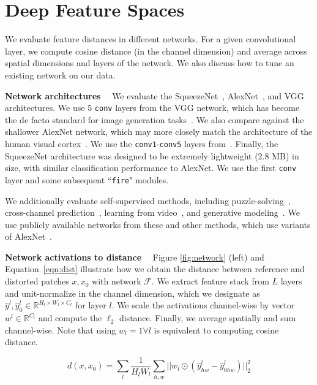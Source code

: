 \section{Deep Feature Spaces}

We evaluate feature distances in different networks. For a given convolutional layer, we compute cosine distance (in the channel dimension) and average across spatial dimensions and layers of the network. We also discuss how to tune an existing network on our data.

  \textbf{Network architectures} \ \  We evaluate the SqueezeNet~\cite{iandola2016squeezenet}, AlexNet~\cite{krizhevsky2012imagenet}, and VGG~\cite{simonyan2014very} architectures. We use 5 \texttt{conv} layers from the VGG network, which has become the de facto standard for image generation tasks~\cite{gatys2016image,dosovitskiy2016generating,chen2017photographic}. We also compare against the shallower AlexNet network, which may more closely match the architecture of the human visual cortex~\cite{yamins2016using}. We use the \texttt{conv1}-\texttt{conv5} layers from~\cite{krizhevsky2014one}. Finally, the SqueezeNet architecture was designed to be extremely lightweight ($2.8$ MB) in size, with similar classification performance to AlexNet. We use the first \texttt{conv} layer and some subsequent ``\texttt{fire}" modules.

We additionally evaluate self-supervised methods, including puzzle-solving~\cite{noroozi2016unsupervised}, cross-channel prediction~\cite{zhang2016colorful,zhang2017split}, learning from video~\cite{pathak2017learning}, and generative modeling~\cite{donahue2016adversarial}. We use publicly available networks from these and other methods, which use variants of AlexNet~\cite{krizhevsky2012imagenet}.

  \textbf{Network activations to distance} \ \  Figure \ref{fig:network} (left) and Equation~\ref{eqn:dist} illustrate how we obtain the distance between reference and distorted patches ${x,x_0}$ with network $\mathcal{F}$. We extract feature stack from $L$ layers and unit-normalize in the channel dimension, which we designate as $\hat{y}^l, \hat{y}_0^l \in \mathds{R}^{H_l\times W_l\times C_l}$ for layer $l$. We scale the activations channel-wise by vector $w^l \in \mathds{R}^{C_l}$ and compute the $\ell_2$ distance. Finally, we average spatially and sum channel-wise. Note that using $w_l=1 \forall l$ is equivalent to computing cosine distance.

\begin{equation}
d(x,x_0) = \sum_l \dfrac{1}{H_l W_l} \sum_{h,w} || w_l \odot ( \hat{y}_{hw}^l - \hat{y}_{0hw}^l ) ||_2^2
\label{eqn:dist}
\end{equation}

